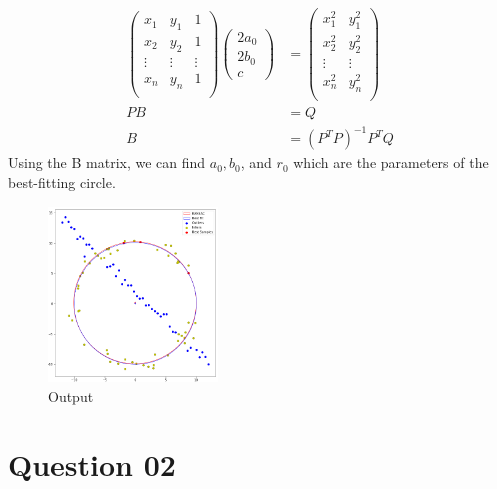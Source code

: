 \documentclass[a4paper]{article}
\begin{document}
    \begin{align*}
      \begin{pmatrix}
        x_1 & y_1 & 1\\
        x_2 & y_2 & 1\\
        \vdots & \vdots & \vdots\\
        x_n & y_n & 1\\
      \end{pmatrix}
      \begin{pmatrix}
        2a_0 \\ 2b_0 \\ c
      \end{pmatrix}&=
      \begin{pmatrix}
        x_1^2 & y_1^2\\
        x_2^2 & y_2^2\\
        \vdots & \vdots \\
        x_n^2 & y_n^2\\
      \end{pmatrix}\\
      PB&=Q\\
      B&=(P^T P)^{-1}P^T Q
    \end{align*}
    Using the B matrix, we can find
     $a_0, b_0$, and $r_0$ which are the parameters of the best-fitting
      circle.
\begin{figure}[!htb]
  \centering
  \includegraphics[width=0.4\textwidth]{images/ransac.png}
  \caption{Output}
  \label{ransac}
\end{figure}
\newpage
\section*{Question 02}
\end{document}
